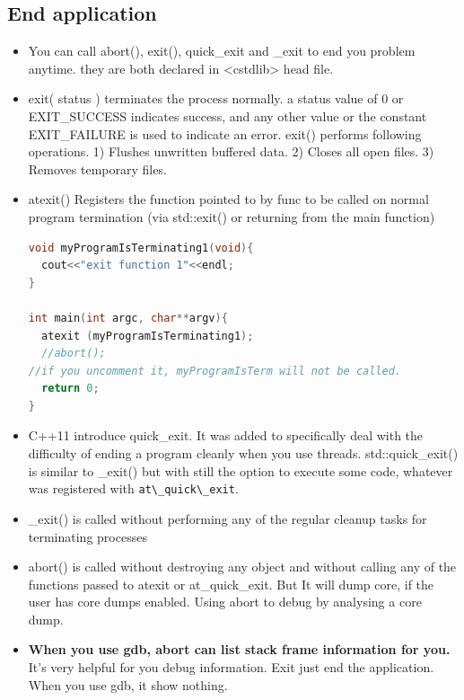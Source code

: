 \documentclass[a4paper,12pt,twoside]{book}
\begin{document}
\subsection{End application}
\begin{itemize}
\item You can call abort(), exit(), quick\_exit and  \_exit to end you problem anytime. they are both declared in <cstdlib> head file.

\item exit( status ) terminates the process normally.
a status value of 0 or EXIT\_SUCCESS indicates success, and any other value or the constant EXIT\_FAILURE is used to indicate an error. exit() performs following operations. 1) Flushes unwritten buffered data.
2) Closes all open files. 3) Removes temporary files.

\item atexit() Registers the function pointed to by func to be called on normal program termination (via std::exit() or returning from the main function)
\begin{lstlisting}[frame=single, language=c++]
void myProgramIsTerminating1(void){
  cout<<"exit function 1"<<endl;
}

int main(int argc, char**argv){
  atexit (myProgramIsTerminating1);
  //abort();
//if you uncomment it, myProgramIsTerm will not be called.
  return 0;
}
\end{lstlisting}

\item C++11 introduce quick\_exit. It was added to specifically deal with the difficulty of ending a program cleanly when you use threads. std::quick\_exit() is similar to \_exit() but with still the option to execute some code, whatever was registered with \verb=at\_quick\_exit=.

\item \_exit() is called without performing any of the regular cleanup tasks for terminating processes

\item abort() is called without destroying any object and without calling any of the functions passed to atexit or at\_quick\_exit. But It will dump core, if the user has core dumps enabled. Using abort to debug by analysing a core dump.

\item \textbf{When you use gdb, abort can list stack frame information for you.} It's very helpful for you debug information.  Exit just end the application. When you use gdb, it show nothing.



\end{itemize}
\end{document}
